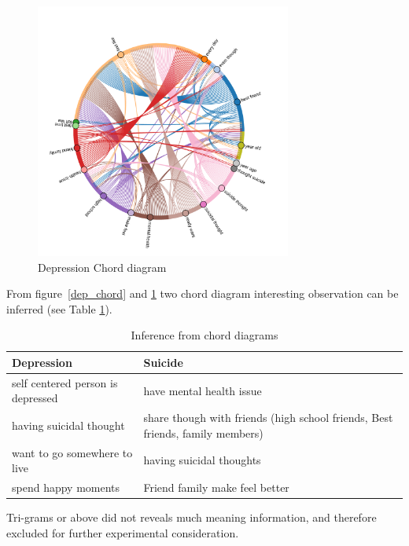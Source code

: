 \documentclass[sn-mathphys,Numbered]{sn-jnl}%
\theoremstyle{thmstyleone}%
\theoremstyle{thmstyletwo}%
\theoremstyle{thmstylethree}%
\begin{document}
\begin{figure}[H]
\centering
    \includegraphics[width=0.75\textwidth]{suicide_chord.png}
    \caption{Depression Chord diagram}
    \label{suicide_chord}
\end{figure}        
From figure~\ref{dep_chord} and \ref{suicide_chord} two chord diagram interesting observation can be inferred (see Table \ref{chord_inference}). 
\begin{table}[h]
\begin{center}
\begin{flushleft}
\caption{Inference from chord diagrams}\label{chord_inference}%
\begin{tabular}{|l|p{6cm}|}
\toprule
\textbf{Depression} & \textbf{Suicide} \\
\midrule
self centered person is depressed & have mental health issue \\
having suicidal thought & share though with friends (high school friends, Best friends, family members) \\
want to go somewhere to live & having suicidal thoughts \\
spend happy moments & Friend family make feel better \\
\bottomrule
\end{tabular}
\end{flushleft}
\end{center}
\end{table}
Tri-grams or above did not reveals much meaning information, and therefore excluded for further experimental consideration. 
\end{document}
